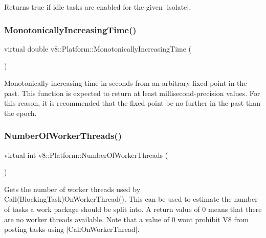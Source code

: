 Returns true if idle tasks are enabled for the given $\vert$isolate$\vert$. \mbox{\label{classv8_1_1Platform_a6d4d7c2dcf6b0c7113099b97fa7f57b7}} 
\subsubsection{\texorpdfstring{Monotonically\+Increasing\+Time()}{MonotonicallyIncreasingTime()}}
{\footnotesize\ttfamily virtual double v8\+::\+Platform\+::\+Monotonically\+Increasing\+Time (\begin{DoxyParamCaption}{ }\end{DoxyParamCaption})\hspace{0.3cm}{\ttfamily [pure virtual]}}

Monotonically increasing time in seconds from an arbitrary fixed point in the past. This function is expected to return at least millisecond-\/precision values. For this reason, it is recommended that the fixed point be no further in the past than the epoch. \mbox{\label{classv8_1_1Platform_a57cdd7eb4c482bfb806c378beeda716d}} 
\subsubsection{\texorpdfstring{Number\+Of\+Worker\+Threads()}{NumberOfWorkerThreads()}}
{\footnotesize\ttfamily virtual int v8\+::\+Platform\+::\+Number\+Of\+Worker\+Threads (\begin{DoxyParamCaption}{ }\end{DoxyParamCaption})\hspace{0.3cm}{\ttfamily [pure virtual]}}

Gets the number of worker threads used by Call(\+Blocking\+Task)On\+Worker\+Thread(). This can be used to estimate the number of tasks a work package should be split into. A return value of 0 means that there are no worker threads available. Note that a value of 0 won\textquotesingle{}t prohibit V8 from posting tasks using $\vert$\+Call\+On\+Worker\+Thread$\vert$. \mbox{\label{classv8_1_1Platform_a7ed41bddc1d1ebe51c55539198d0026e}} 
